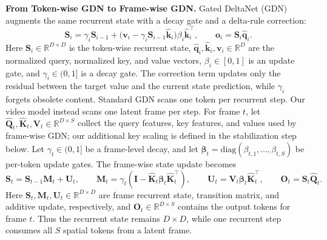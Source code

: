 \documentclass{llmxive}
\begin{document}
\noindent \textbf{From Token-wise GDN to Frame-wise GDN.}
Gated DeltaNet (GDN)~\citep{gated_deltanet} augments the same recurrent state with a decay gate and a delta-rule correction:
\begin{equation}
\label{eq:token_gdn}
\mathbf{S}_i
=\gamma_i\mathbf{S}_{i-1}
+\big(\mathbf{v}_i-\gamma_i\mathbf{S}_{i-1}\hat{\mathbf{k}}_i\big)\beta_i\hat{\mathbf{k}}_i^\top,
\qquad
\mathbf{o}_i=\mathbf{S}_i\hat{\mathbf{q}}_i .
\end{equation}
Here $\mathbf{S}_i\in\mathbb{R}^{D\times D}$ is the token-wise recurrent state, $\hat{\mathbf{q}}_i,\hat{\mathbf{k}}_i,\mathbf{v}_i\in\mathbb{R}^{D}$ are the normalized query, normalized key, and value vectors, $\beta_i\in[0,1]$ is an update gate, and $\gamma_i\in(0,1]$ is a decay gate.
The correction term updates only the residual between the target value and the current state prediction, while $\gamma_i$ forgets obsolete content.
Standard GDN scans one token per recurrent step.
Our video model instead scans one latent frame per step.
For frame $t$, let $\hat{\mathbf{Q}}_t,\hat{\mathbf{K}}_t,\mathbf{V}_t\in\mathbb{R}^{D\times S}$ collect the query features, key features, and values used by frame-wise GDN; our additional key scaling is defined in the stabilization step below.
Let $\gamma_t\in(0,1]$ be a frame-level decay, and let $\boldsymbol{\beta}_t=\mathrm{diag}(\beta_{t,1},\ldots,\beta_{t,S})$ be per-token update gates.
The frame-wise state update becomes
\begin{equation}
\label{eq:frame_gdn}
\mathbf{S}_t
=\mathbf{S}_{t-1}\mathbf{M}_t+\mathbf{U}_t,\qquad
\mathbf{M}_t=\gamma_t\!\left(\mathbf{I}-\hat{\mathbf{K}}_t\boldsymbol{\beta}_t\hat{\mathbf{K}}_t^\top\right),\qquad
\mathbf{U}_t=\mathbf{V}_t\boldsymbol{\beta}_t\hat{\mathbf{K}}_t^\top,\qquad
\mathbf{O}_t=\mathbf{S}_t\hat{\mathbf{Q}}_t .
\end{equation}
Here $\mathbf{S}_t,\mathbf{M}_t,\mathbf{U}_t\in\mathbb{R}^{D\times D}$ are frame recurrent state, transition matrix, and additive update, respectively, and $\mathbf{O}_t\in\mathbb{R}^{D\times S}$ contains the output tokens for frame $t$.
Thus the recurrent state remains $D\times D$, while one recurrent step consumes all $S$ spatial tokens from a latent frame.
\end{document}
